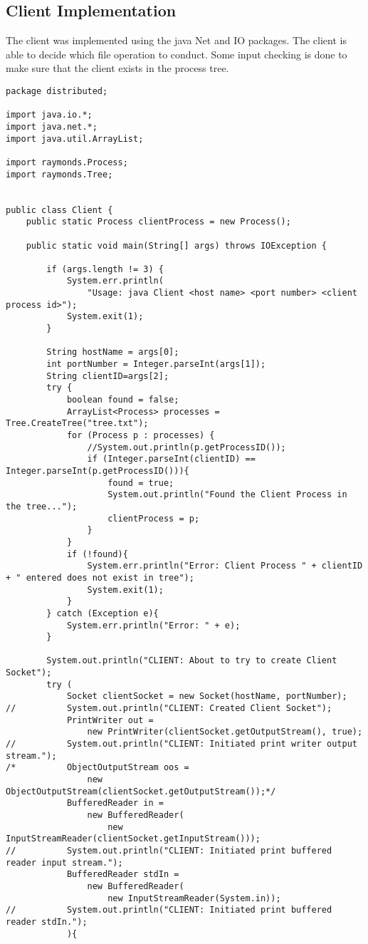 \documentclass{article}
\begin{document}
	\subsection{Client Implementation}
	The client was implemented using the java Net and IO packages. The client is able to decide which file operation to conduct. Some input checking is done to make sure that the client exists in the process tree. 
		\begin{lstlisting}
package distributed;

import java.io.*;
import java.net.*;
import java.util.ArrayList;

import raymonds.Process;
import raymonds.Tree;


public class Client {
	public static Process clientProcess = new Process();
	
	public static void main(String[] args) throws IOException {
        
        if (args.length != 3) {
            System.err.println(
                "Usage: java Client <host name> <port number> <client process id>");
            System.exit(1);
        }
 
        String hostName = args[0];
        int portNumber = Integer.parseInt(args[1]);
        String clientID=args[2];
        try {
			boolean found = false;
			ArrayList<Process> processes = Tree.CreateTree("tree.txt");
			for (Process p : processes) {
				//System.out.println(p.getProcessID());
				if (Integer.parseInt(clientID) == Integer.parseInt(p.getProcessID())){
					found = true;
					System.out.println("Found the Client Process in the tree...");
					clientProcess = p;
				}
			}
			if (!found){
				System.err.println("Error: Client Process " + clientID + " entered does not exist in tree");
				System.exit(1);
			}
		} catch (Exception e){
			System.err.println("Error: " + e);
		}
        
        System.out.println("CLIENT: About to try to create Client Socket");
        try (
            Socket clientSocket = new Socket(hostName, portNumber);
//        	System.out.println("CLIENT: Created Client Socket");
        	PrintWriter out =
                new PrintWriter(clientSocket.getOutputStream(), true);
//        	System.out.println("CLIENT: Initiated print writer output stream.");
/*        	ObjectOutputStream oos = 
        		new ObjectOutputStream(clientSocket.getOutputStream());*/
        	BufferedReader in =
                new BufferedReader(
                    new InputStreamReader(clientSocket.getInputStream()));
//        	System.out.println("CLIENT: Initiated print buffered reader input stream.");
            BufferedReader stdIn =
                new BufferedReader(
                    new InputStreamReader(System.in));
//        	System.out.println("CLIENT: Initiated print buffered reader stdIn.");
        	){
        	

\end{lstlisting}
\end{document}
